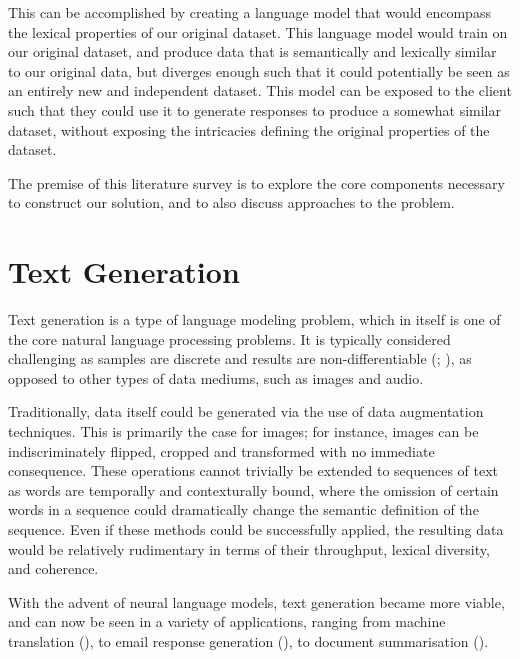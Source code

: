 \documentclass[12pt,twoside]{report}
\begin{document}
This can be accomplished by creating a language model that would encompass the lexical properties of our original dataset. This language model would train on our original dataset, and produce data that is semantically and lexically similar to our original data, but diverges enough such that it could potentially be seen as an entirely new and independent dataset. This model can be exposed to the client such that  they could use it to generate responses to produce a somewhat similar dataset, without exposing the intricacies defining the original properties of the dataset.

The premise of this literature survey is to explore the core components necessary to construct our solution, and to also discuss approaches to the problem.

\section{Text Generation}


Text generation is a type of language modeling problem, which in itself is one of the core natural language processing problems. It is typically considered challenging as samples are discrete and results are non-differentiable (\cite{kovalenko_controllable_2017}; \cite{kovalenko_controllable_2017-1}), as opposed to other types of data mediums, such as images and audio.

Traditionally, data itself could be generated via the use of data augmentation techniques. This is primarily the case for images; for instance, images can be indiscriminately flipped, cropped and transformed with no immediate consequence. These operations cannot trivially be extended to sequences of text as words are temporally and contexturally bound, where the omission of certain words in a sequence could dramatically change the semantic definition of the sequence. Even if these methods could be successfully applied, the resulting data would be relatively rudimentary in terms of their throughput, lexical diversity, and coherence.

With the advent of neural language models, text generation became more viable, and can now be seen in a variety of applications, ranging from machine translation (\cite{sutskever_sequence_2014}), to email response generation (\cite{kannan_smart_2016}), to document summarisation (\cite{nallapati_summarunner_2016}).
\end{document}
